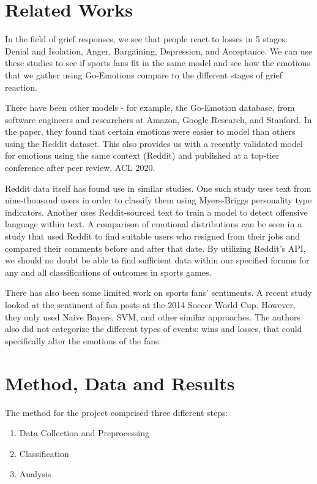 \documentclass{article}
\begin{document}
\section{Related Works}

In the field of grief responses, we see that people react to losses in 5 stages: Denial and Isolation, Anger, Bargaining, Depression, and Acceptance. We can use these studies \cite{Mughal2023-rg} to see if sports fans fit in the same model and see how the emotions that we gather using Go-Emotions compare to the different stages of grief reaction.

There have been other models - for example, the Go-Emotion database, from software engineers and researchers at Amazon, Google Research, and Stanford. In the paper, they found that certain emotions were easier to model than others using the Reddit dataset\cite{demszky-etal-2020-goemotions}. This also provides us with a recently validated model for emotions using the same context (Reddit) and published at a top-tier conference after peer review, ACL 2020.

Reddit data itself has found use in similar studies. One such study uses text from nine-thousand users in order to classify them using Myers-Briggs personality type indicators\cite{gjurkovic-snajder-2018-Reddit}. Another uses Reddit-sourced text to train a model to detect offensive language within text\cite{hada-etal-2021-ruddit}. A comparison of emotional distributions can be seen in a study that used Reddit to find suitable users who resigned from their jobs and compared their comments before and after that date\cite{ireland-etal-2023-sadness}. By utilizing Reddit's API, we should no doubt be able to find sufficient data within our specified forums for any and all classifications of outcomes in sports games.

There has also been some limited work on sports fans' sentiments. A recent study \cite{patel2020sentiment} looked at the sentiment of fan posts at the 2014 Soccer World Cup. However, they only used Naive Bayers, SVM, and other similar approaches. The authors also did not categorize the different types of events: wins and losses, that could specifically alter the emotions of the fans. 
\section{Method, Data and Results}

The method for the project comprised three different steps:
\begin{enumerate}
    \item Data Collection and Preprocessing
    \item Classification
    \item Analysis
\end{enumerate}
\end{document}
